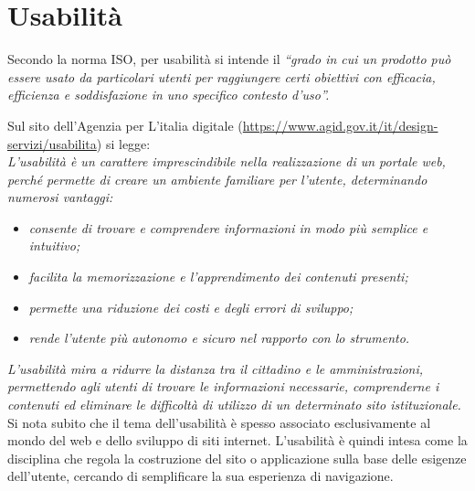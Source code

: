 \section{Usabilità}

Secondo la norma ISO, per usabilità si intende il \textit{``grado in cui un prodotto può essere usato da particolari utenti per raggiungere certi obiettivi con efficacia, efficienza e soddisfazione in uno specifico contesto d’uso''.} 

Sul sito dell'Agenzia per L'italia digitale (\url{https://www.agid.gov.it/it/design-servizi/usabilita}) si legge: \\

\textit{L'usabilità è un carattere imprescindibile nella realizzazione di un portale web, perché permette di creare un ambiente familiare per l'utente, determinando numerosi vantaggi:}

\begin{itemize}
    \item \textit{consente di trovare e comprendere informazioni in modo più semplice e intuitivo;}
    \item \textit{facilita la memorizzazione e l'apprendimento dei contenuti presenti;}
    \item \textit{permette una riduzione dei costi e degli errori di sviluppo;}
    \item \textit{rende l'utente più autonomo e sicuro nel rapporto con lo strumento.}
\end{itemize}

\textit{L'usabilità mira a ridurre la distanza tra il cittadino e le amministrazioni, permettendo agli utenti di trovare le informazioni necessarie, comprenderne i contenuti ed eliminare le difficoltà di utilizzo di un determinato sito istituzionale.}\\

Si nota subito che il tema dell'usabilità è spesso associato esclusivamente al mondo del web e dello sviluppo di siti internet. L'usabilità è quindi intesa come la disciplina che regola la costruzione del sito o applicazione sulla base delle esigenze dell’utente, cercando di semplificare la sua esperienza di navigazione.

